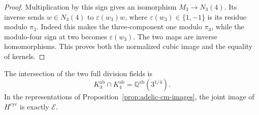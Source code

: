 \begin{proof}
Multiplication by this sign gives an isomorphism
$M_3\to N_3(4)$.  Its inverse sends $w\in N_3(4)$ to
$\varepsilon(w_3)w$, where
$\varepsilon(w_3)\in\{1,-1\}$ is its residue modulo $\pi_3$.
Indeed this makes the three-component one modulo $\pi_3$, while
the modulo-four sign at two becomes $\varepsilon(w_3)$.
The two maps are inverse homomorphisms.  This proves both the
normalized cubic image and the equality of kernels.
\end{proof}

\begin{lemma}\label{lem:adelic-cm-entanglement}
The intersection of the two full division fields is
\begin{equation}
 K_3^{\mathrm{ab}}\cap K_4^{\mathrm{ab}}
       =\mathbb Q^{\mathrm{ab}}(3^{1/4}).
 \label{eq:adelic-cm-intersection}
\end{equation}
In the representations of Proposition~\ref{prop:adelic-cm-images},
the joint image of $H^{\mathrm{cyc}}$ is exactly $\mathcal E$.
\end{lemma}

